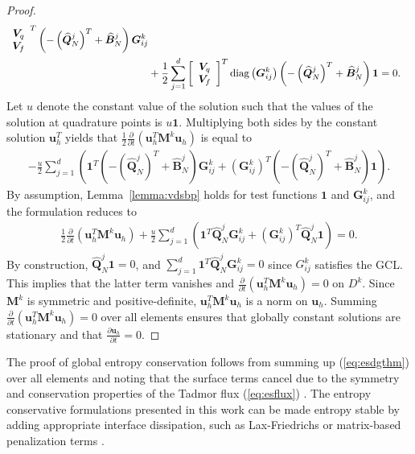 \documentclass{svjour3}                     %
\renewcommand{\hat}{\widehat}
\newcommand{\diag}[1]{{\rm diag}\LRp{#1}}
\newcommand{\pd}[2]{\frac{\partial#1}{\partial#2}}
\newcommand{\LRp}[1]{\left( #1 \right)}
\newcommand{\LRs}[1]{\left[ #1 \right]}
\begin{document}
\begin{proof}
\begin{align*}
{\begin{array}{cc}
\bm{V}_q \\
\bm{V}_f\end{array}}^T \LRp{-\LRp{\hat{\bm{Q}}^j_N}^T +\hat{\bm{B}}^j_N}\bm{G}^k_{ij}\\
&+ \frac{1}{2} \sum_{j=1}^d \LRs{\begin{array}{cc}
\bm{V}_q \\
\bm{V}_f\end{array}}^T\diag{\bm{G}^k_{ij}} \LRp{-\LRp{\hat{\bm{Q}}^j_N}^T +\hat{\bm{B}}^j_N}\bm{1} = 0.
\end{align*}
Let $u$ denote the constant value of the solution such that the values of the solution at quadrature points is $u\bm{1}$.  Multiplying both sides by the constant solution $\bm{u}_h^T$ yields that $\frac{1}{2}\pd{}{t}\LRp{\bm{u}_h^T\bm{M}^k\bm{u}_h}$ is equal to 
\begin{align*}
-\frac{u}{2} \sum_{j=1}^d \LRp{\bm{1}^T \LRp{-\LRp{\hat{\bm{Q}}^j_N}^T +\hat{\bm{B}}^j_N}\bm{G}^k_{ij}
+\LRp{\bm{G}^k_{ij}}^T \LRp{-\LRp{\hat{\bm{Q}}^j_N}^T +\hat{\bm{B}}^j_N}\bm{1}}.%
\end{align*}
By assumption, Lemma~\ref{lemma:vdsbp} holds for test functions $\bm{1}$ and $\bm{G}^k_{ij}$, and the formulation reduces to
\begin{align*}
\frac{1}{2}\pd{}{t}\LRp{\bm{u}_h^T\bm{M}^k\bm{u}_h} + \frac{u}{2} \sum_{j=1}^d \LRp{\bm{1}^T \hat{\bm{Q}}^j_N\bm{G}^k_{ij}
+\LRp{\bm{G}^k_{ij}}^T \hat{\bm{Q}}^j_N\bm{1}} = 0.
\end{align*}
By construction, $\hat{\bm{Q}}^j_N\bm{1} = 0$, and $\sum_{j=1}^d \bm{1}^T \hat{\bm{Q}}^j_N\bm{G}^k_{ij} = 0$ since $G^k_{ij}$ satisfies the GCL.  This implies that the latter term vanishes and $\pd{}{t}\LRp{\bm{u}_h^T\bm{M}^k\bm{u}_h} = 0$ on $D^k$.  Since $\bm{M}^k$ is symmetric and positive-definite, $\bm{u}_h^T\bm{M}^k\bm{u}_h$ is a norm on $\bm{u}_h$.  Summing $\pd{}{t}\LRp{\bm{u}_h^T\bm{M}^k\bm{u}_h} = 0$ over all elements ensures that globally constant solutions are stationary and that $\pd{\bm{u}_h}{t} = 0$.  
\end{proof}

The proof of global entropy conservation follows from summing up (\ref{eq:esdgthm}) over all elements and noting that the surface terms cancel due to the symmetry and conservation properties of the Tadmor flux (\ref{eq:esflux}) \cite{chan2017discretely}.  The entropy conservative formulations presented in this work can be made entropy stable by adding appropriate interface dissipation, such as Lax-Friedrichs or matrix-based penalization terms \cite{winters2017uniquely, chen2017entropy, chan2017discretely}.  
\end{document}
